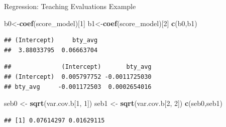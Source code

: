 \documentclass[
  ignorenonframetext,
]{beamer}
\newenvironment{Shaded}{\begin{snugshade}}{\end{snugshade}}
\newcommand{\DecValTok}[1]{\textcolor[rgb]{0.00,0.00,0.81}{#1}}
\newcommand{\FunctionTok}[1]{\textcolor[rgb]{0.13,0.29,0.53}{\textbf{#1}}}
\newcommand{\NormalTok}[1]{#1}
\newcommand{\OtherTok}[1]{\textcolor[rgb]{0.56,0.35,0.01}{#1}}
\newcommand{\SpecialCharTok}[1]{\textcolor[rgb]{0.81,0.36,0.00}{\textbf{#1}}}
\begin{document}
\begin{frame}[fragile]{Regression: Teaching Evaluations Example}
\protect\hypertarget{regression-teaching-evaluations-example-7}{}
\tiny

\begin{Shaded}
\begin{Highlighting}[]
\NormalTok{b0}\OtherTok{\textless{}{-}}\FunctionTok{coef}\NormalTok{(score\_model)[}\DecValTok{1}\NormalTok{]}
\NormalTok{b1}\OtherTok{\textless{}{-}}\FunctionTok{coef}\NormalTok{(score\_model)[}\DecValTok{2}\NormalTok{]}
\FunctionTok{c}\NormalTok{(b0,b1)}
\end{Highlighting}
\end{Shaded}

\begin{verbatim}
## (Intercept)     bty_avg 
##  3.88033795  0.06663704
\end{verbatim}

\begin{Shaded}
\end{Shaded}

\begin{verbatim}
##              (Intercept)       bty_avg
## (Intercept)  0.005797752 -0.0011725030
## bty_avg     -0.001172503  0.0002654016
\end{verbatim}

\begin{Shaded}
\begin{Highlighting}[]
\NormalTok{seb0 }\OtherTok{\textless{}{-}} \FunctionTok{sqrt}\NormalTok{(var.cov.b[}\DecValTok{1}\NormalTok{, }\DecValTok{1}\NormalTok{])}
\NormalTok{seb1 }\OtherTok{\textless{}{-}} \FunctionTok{sqrt}\NormalTok{(var.cov.b[}\DecValTok{2}\NormalTok{, }\DecValTok{2}\NormalTok{])}
\FunctionTok{c}\NormalTok{(seb0,seb1)}
\end{Highlighting}
\end{Shaded}

\begin{verbatim}
## [1] 0.07614297 0.01629115
\end{verbatim}

\normalsize
\end{frame}
\end{document}
